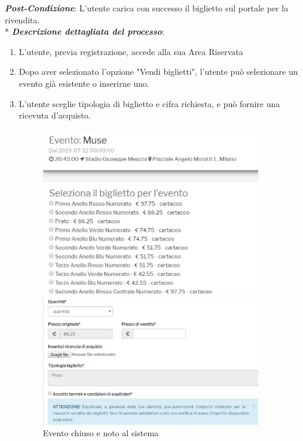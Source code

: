 \textbf{\textit{Post-Condizione}}: L'utente carica con successo il biglietto sul portale per la rivendita. \\*
\textbf{\textit{Descrizione dettagliata del processo}}:
\begin{enumerate}
\item L'utente, previa registrazione, accede alla sua Area Riservata
\item Dopo aver selezionato l'opzione "Vendi biglietti", l'utente può selezionare un evento già esistente o inserirne uno. 
\item L'utente sceglie tipologia di biglietto e cifra richiesta, e può fornire una ricevuta d'acquisto.
\begin{figure}[htbp]
    \centering
    \begin{minipage}{0.45\textwidth}
        \centering
        \includegraphics[width=0.9\textwidth]{chapter4/immagini/es_chiuso} %
        \caption{Evento chiuso e noto al sistema}
				\label{evchiuso1}
    \end{minipage}\hfill
    \begin{minipage}{0.45\textwidth}
        \centering
        \includegraphics[width=0.9\textwidth]{chapter4/immagini/es_chiuso_2} %

\end{minipage}
\end{figure}
\end{enumerate}

